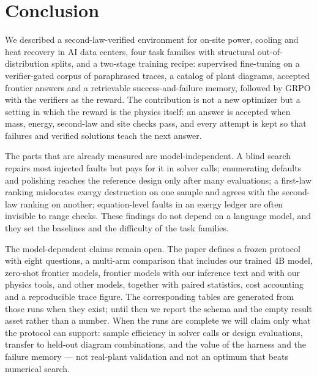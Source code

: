\section{Conclusion}\label{sec:conclusion}

We described a second-law-verified environment for on-site power, cooling and heat recovery in AI data centers, four task families with structural out-of-distribution splits, and a two-stage training recipe: supervised fine-tuning on a verifier-gated corpus of paraphrased traces, a catalog of plant diagrams, accepted frontier answers and a retrievable success-and-failure memory, followed by GRPO with the verifiers as the reward. The contribution is not a new optimizer but a setting in which the reward is the physics itself: an answer is accepted when mass, energy, second-law and site checks pass, and every attempt is kept so that failures and verified solutions teach the next answer.

The parts that are already measured are model-independent. A blind search repairs most injected faults but pays for it in solver calls; enumerating defaults and polishing reaches the reference design only after many evaluations; a first-law ranking mislocates exergy destruction on one sample and agrees with the second-law ranking on another; equation-level faults in an exergy ledger are often invisible to range checks. These findings do not depend on a language model, and they set the baselines and the difficulty of the task families.

The model-dependent claims remain open. The paper defines a frozen protocol with eight questions, a multi-arm comparison that includes our trained 4B model, zero-shot frontier models, frontier models with our inference text and with our physics tools, and other models, together with paired statistics, cost accounting and a reproducible trace figure. The corresponding tables are generated from those runs when they exist; until then we report the schema and the empty result asset rather than a number. When the runs are complete we will claim only what the protocol can support: sample efficiency in solver calls or design evaluations, transfer to held-out diagram combinations, and the value of the harness and the failure memory --- not real-plant validation and not an optimum that beats numerical search.
